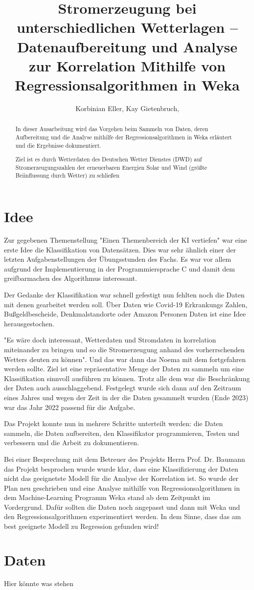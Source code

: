 \documentclass[letterpaper]{article} %
\title{Stromerzeugung bei unterschiedlichen Wetterlagen -- Datenaufbereitung und Analyse zur Korrelation Mithilfe von Regressionsalgorithmen in Weka}
\author {
    Korbinian Eller,
    Kay Gietenbruch,
}
\begin{document}
\maketitle
\begin{abstract}
    In dieser Ausarbeitung wird das Vorgehen beim Sammeln von Daten, deren Aufbereitung und die Analyse mithilfe der Regressionsalgorithmen in Weka erläutert und die Ergebnisse dokumentiert.
    
    Ziel ist es durch Wetterdaten des Deutschen Wetter Dienstes (DWD) auf Stromerzeugungszahlen der erneuerbaren Energien Solar und Wind (größte Beiinflussung durch Wetter) zu schließen  
\end{abstract}
\section*{Idee}
    Zur gegebenen Themenstellung "Einen Themenbereich der KI vertiefen" war eine erste Idee die Klassifikation von Datensätzen.
    Dies war sehr ähnlich einer der letzten Aufgabenstellungen der Übungsstunden des Fachs.
    Es war vor allem aufgrund der Implementierung in der Programmiersprache C und damit dem greifbarmachen des Algorithmus interessant.

    Der Gedanke der Klassifikation war schnell gefestigt nun fehlten noch die Daten mit denen gearbeitet werden soll. Über Daten wie Covid-19 Erkrankungs Zahlen, Bußgeldbescheide, Denkmalstandorte oder Amazon Personen Daten ist eine Idee herausgestochen.

    "Es wäre doch interessant, Wetterdaten und Stromdaten in korrelation miteinander zu bringen und so die Stromerzeugung anhand des vorherrschenden Wetters deuten zu können". Und das war dann das Noema mit dem fortgefahren werden sollte. Ziel ist eine repräsentative Menge der Daten zu sammeln um eine Klassifikation sinnvoll ausführen zu können. Trotz alle dem war die Beschränkung der Daten auch ausschlaggebend. Festgelegt wurde sich dann auf den Zeitraum eines Jahres und wegen der Zeit in der die Daten gesammelt wurden (Ende 2023) war das Jahr 2022 passend für die Aufgabe.
    
    Das Projekt konnte nun in mehrere Schritte unterteilt werden: die Daten sammeln, die Daten aufbereiten, den Klassifikator programmieren, Testen und verbessern und die Arbeit zu dokumentieren.

    Bei einer Besprechung mit dem Betreuer des Projekts Herrn Prof. Dr. Baumann das Projekt besprochen wurde wurde klar, dass eine Klassifizierung der Daten nicht das geeignetste Modell für die Analyse der 
    Korrelation ist. So wurde der Plan neu geschrieben und eine Analyse mithilfe von Regressionsalgorithmen in dem Machine-Learning Programm Weka stand ab dem Zeitpunkt im Vordergrund.
    Dafür sollten die Daten noch angepasst und dann mit Weka und den Regressionsalgorithmen experimentiert werden. In dem Sinne, dass das am best geeignete Modell zu Regression gefunden wird!
\section*{Daten}
    Hier könnte was stehen
\end{document}
